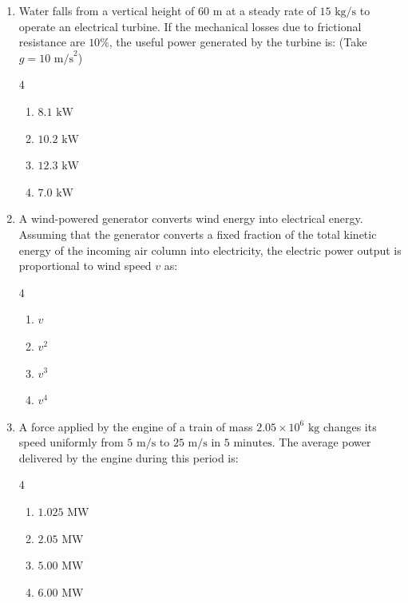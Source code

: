 \documentclass[11pt,a4paper]{article}
\begin{document}
\begin{enumerate}[label=\textbf{\arabic*.},leftmargin=18pt,itemsep=8pt,resume]
  \item Water falls from a vertical height of $60\text{ m}$ at a steady rate of $15\text{ kg/s}$ to operate an electrical turbine. If the mechanical losses due to frictional resistance are $10\%$, the useful power generated by the turbine is: (Take $g = 10\text{ m/s}^2$)
  \begin{multicols}{4}
    \begin{enumerate}[label=(\Alph*)]
      \item $8.1\text{ kW}$
      \item $10.2\text{ kW}$
      \item $12.3\text{ kW}$
      \item $7.0\text{ kW}$
    \end{enumerate}
  \end{multicols}

  \item A wind-powered generator converts wind energy into electrical energy. Assuming that the generator converts a fixed fraction of the total kinetic energy of the incoming air column into electricity, the electric power output is proportional to wind speed $v$ as:
  \begin{multicols}{4}
    \begin{enumerate}[label=(\Alph*)]
      \item $v$
      \item $v^2$
      \item $v^3$
      \item $v^4$
    \end{enumerate}
  \end{multicols}

  \item A force applied by the engine of a train of mass $2.05 \times 10^6\text{ kg}$ changes its speed uniformly from $5\text{ m/s}$ to $25\text{ m/s}$ in $5\text{ minutes}$. The average power delivered by the engine during this period is:
  \begin{multicols}{4}
    \begin{enumerate}[label=(\Alph*)]
      \item $1.025\text{ MW}$
      \item $2.05\text{ MW}$
      \item $5.00\text{ MW}$
      \item $6.00\text{ MW}$
    \end{enumerate}
  \end{multicols}


\end{enumerate}
\end{document}
